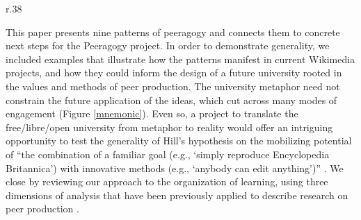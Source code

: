 



\begingroup
\setlength{\columnsep}{5pt}%

\begin{wrapfigure}{r}{.38\textwidth}
\vspace{-2cm}
\hspace{.15cm}
\resizebox{.37\textwidth}{!}{

}
\vspace{-2.3cm}
\caption{Mnemonic \label{mnemonic}}
\vspace{-.5cm}
\end{wrapfigure}

This paper presents nine patterns of peeragogy and connects them to
concrete next steps for the Peeragogy project.  In order to
demonstrate generality, we included examples that illustrate how the
patterns manifest in current Wikimedia projects, and how they could
inform the design of a future university rooted in the values and
methods of peer production.
%
The university metaphor need not constrain the future application of
the ideas, which cut across many modes of engagement (Figure \ref{mnemonic}).
Even so, a project to translate the free\slash libre\slash open
university from metaphor to reality would offer an intriguing
opportunity to test the generality of Hill's hypothesis on the
mobilizing potential of ``the combination of a familiar goal (e.g.,
`simply reproduce Encyclopedia Britannica') with innovative methods
(e.g., `anybody can edit anything')'' \cite[p.~13]{mako-thesis}.  We
close by reviewing our approach to the organization of learning, using
three dimensions of analysis that have been previously applied to
describe research on peer production \cite{benkler2015peer}.

